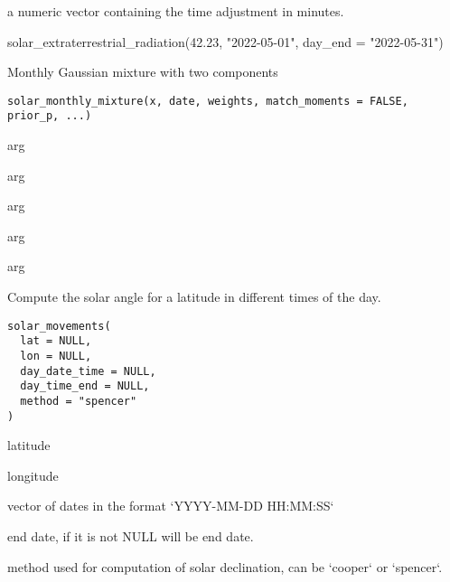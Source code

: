 \documentclass[a4paper]{book}
\begin{document}
%
\begin{Value}
a numeric vector containing the time adjustment in minutes.
\end{Value}
%
\begin{Examples}
\begin{ExampleCode}
solar_extraterrestrial_radiation(42.23, "2022-05-01", day_end = "2022-05-31")
\end{ExampleCode}
\end{Examples}
%
\begin{Description}\relax
Monthly Gaussian mixture with two components
\end{Description}
%
\begin{Usage}
\begin{verbatim}
solar_monthly_mixture(x, date, weights, match_moments = FALSE, prior_p, ...)
\end{verbatim}
\end{Usage}
%
\begin{Arguments}
\begin{ldescription}
\item[\code{x}] arg

\item[\code{date}] arg

\item[\code{weights}] arg

\item[\code{match\_moments}] arg

\item[\code{...}] arg
\end{ldescription}
\end{Arguments}
%
\begin{Description}\relax
Compute the solar angle for a latitude in different times of the day.
\end{Description}
%
\begin{Usage}
\begin{verbatim}
solar_movements(
  lat = NULL,
  lon = NULL,
  day_date_time = NULL,
  day_time_end = NULL,
  method = "spencer"
)
\end{verbatim}
\end{Usage}
%
\begin{Arguments}
\begin{ldescription}
\item[\code{lat}] latitude

\item[\code{lon}] longitude

\item[\code{day\_date\_time}] vector of dates in the format `YYYY-MM-DD HH:MM:SS`

\item[\code{day\_time\_end}] end date, if it is not NULL will be end date.

\item[\code{method}] method used for computation of solar declination, can be `cooper` or `spencer`.
\end{ldescription}
\end{Arguments}
\end{document}
